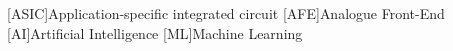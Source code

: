 \chapter*{\LangACRO}
\begin{acronym}[Bash]
    [ASIC]{Application-specific integrated circuit}
    [AFE]{Analogue Front-End}
    [AI]{Artificial Intelligence}
    [ML]{Machine Learning}
\end{acronym}